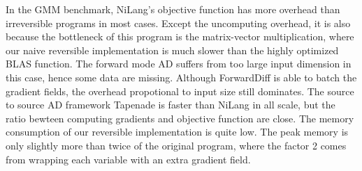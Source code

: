 \documentclass{article}
\newcommand{\<}{\langle}
\renewcommand{\>}{\rangle}
\newcommand{\ra}[1]{\renewcommand{\arraystretch}{#1}}
\theoremstyle{definition}\newtheorem{definition}{\textit{Definition}}
\begin{document}
In the GMM benchmark, NiLang's objective function has more overhead than irreversible programs in most cases.
Except the uncomputing overhead, it is also because the bottleneck of this program is the matrix-vector multiplication,
where our naive reversible implementation is much slower than the highly optimized BLAS function.
The forward mode AD suffers from too large input dimension in this case, hence some data are missing.
Although ForwardDiff is able to batch the gradient fields, the overhead propotional to input size still dominates.
The source to source AD framework Tapenade is faster than NiLang in all scale,
but the ratio bewteen computing gradients and objective function are close.
The memory consumption of our reversible implementation is quite low.
The peak memory is only slightly more than twice of the original program,
where the factor 2 comes from wrapping each variable with an extra gradient field.

\begin{table}[h!]\centering
    \scriptsize
\begin{minipage}{\columnwidth}
\ra{1.3}
    \caption{Absolute runtimes in seconds for computing the objective (O) and Jacobians (J) in bundle adjustment.}\label{tbl:ba}
\end{minipage}
\end{table}
\end{document}
